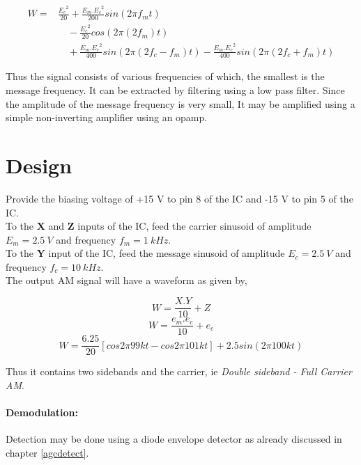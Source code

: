 \begin{equation}
\begin{split}
W=& \frac{{E_c}^2}{20}+\frac{E_m.{E_c}^2}{200}sin(2\pi f_mt) \\
&\quad -\frac{{E_c}^2}{20}cos(2\pi(2f_m)t) \\
&\quad +\frac{E_m.{E_c}^2}{400}sin(2\pi (2f_c-f_m)t)  -  \frac{E_m.{E_c}^2}{400}sin(2\pi (2f_c+f_m)t)
\end{split}
\end{equation}

Thus the signal consists of various frequencies of which, the smallest is the message frequency. It can be extracted by filtering using a low pass filter. Since the amplitude of the message frequency is very small, It may be amplified using a simple non-inverting amplifier using an opamp.

\section*{Design}
Provide the biasing voltage of +15 V to pin 8 of the IC and -15 V to pin 5 of the IC.\\

\noindent To the \textbf{X} and \textbf{Z} inputs of the IC, feed the carrier sinusoid of amplitude $E_m=2.5\ V$ and frequency $f_m= 1\ kHz$.\\
To the \textbf{Y} input of the IC, feed the message sinusoid of amplitude $E_c=2.5\ V$ and frequency $f_c= 10\ kHz$.\\

\noindent The output AM signal will have a waveform as given by,

\begin{equation}
W=\frac{X.Y}{10}+Z
\end{equation}
\begin{equation}
W=\frac{e_m.e_c}{10}+e_c
\end{equation}
\begin{equation}
W=\frac{6.25}{20}[cos 2\pi 99kt-cos 2\pi 101kt]+2.5 sin(2\pi100kt)
\end{equation}

\noindent Thus it contains two sidebands and the carrier, ie \emph{Double sideband - Full Carrier AM}.
\paragraph{Demodulation:}
Detection may be done using a diode envelope detector as already discussed in chapter \ref{agcdetect}.

